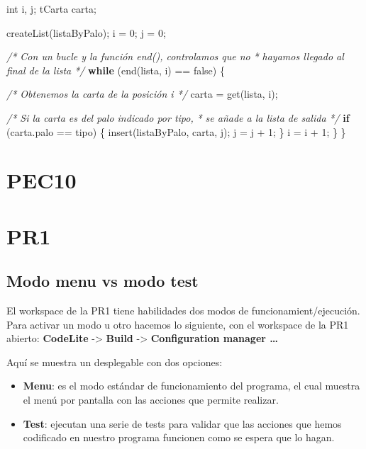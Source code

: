 \documentclass[
]{book}
\newenvironment{Shaded}{\begin{snugshade}}{\end{snugshade}}
\newcommand{\CommentTok}[1]{\textcolor[rgb]{0.56,0.35,0.01}{\textit{#1}}}
\newcommand{\ControlFlowTok}[1]{\textcolor[rgb]{0.13,0.29,0.53}{\textbf{#1}}}
\newcommand{\DataTypeTok}[1]{\textcolor[rgb]{0.13,0.29,0.53}{#1}}
\newcommand{\DecValTok}[1]{\textcolor[rgb]{0.00,0.00,0.81}{#1}}
\newcommand{\NormalTok}[1]{#1}
\providecommand{\tightlist}{%
  \setlength{\itemsep}{0pt}\setlength{\parskip}{0pt}}
\begin{document}
\begin{Shaded}
\begin{Highlighting}[]
    \DataTypeTok{int}\NormalTok{ i, j;}
\NormalTok{    tCarta carta;}

\NormalTok{    createList(listaByPalo);}
\NormalTok{    i = }\DecValTok{0}\NormalTok{;}
\NormalTok{    j = }\DecValTok{0}\NormalTok{;}

    \CommentTok{/* Con un bucle y la función end(), controlamos que no }
\CommentTok{     * hayamos llegado al final de la lista}
\CommentTok{     */}
   \ControlFlowTok{while}\NormalTok{ (end(lista, i) == false) \{}

        \CommentTok{/* Obtenemos la carta de la posición i */}
\NormalTok{        carta = get(lista, i);}

        \CommentTok{/* Si la carta es del palo indicado por tipo, }
\CommentTok{         * se añade a la lista de salida}
\CommentTok{         */}
        \ControlFlowTok{if}\NormalTok{ (carta.palo == tipo) \{}
\NormalTok{            insert(listaByPalo, carta, j);}
\NormalTok{            j = j + }\DecValTok{1}\NormalTok{;}
\NormalTok{        \}}
\NormalTok{        i = i + }\DecValTok{1}\NormalTok{;}
\NormalTok{    \}}
\NormalTok{\}}
\end{Highlighting}
\end{Shaded}

\hypertarget{pec10}{%
\chapter{PEC10}\label{pec10}}

\hypertarget{pr1}{%
\chapter{PR1}\label{pr1}}

\hypertarget{modo-menu-vs-modo-test}{%
\section{Modo menu vs modo test}\label{modo-menu-vs-modo-test}}

El workspace de la PR1 tiene habilidades dos modos de funcionamient/ejecución. Para activar un modo u otro hacemos lo siguiente, con el workspace de la PR1 abierto: \textbf{CodeLite} -\textgreater{} \textbf{Build} -\textgreater{} \textbf{Configuration manager \ldots{}}

Aquí se muestra un desplegable con dos opciones:

\begin{itemize}
\tightlist
\item
  \textbf{Menu}: es el modo estándar de funcionamiento del programa, el cual muestra el menú por pantalla con las acciones que permite realizar.
\item
  \textbf{Test}: ejecutan una serie de tests para validar que las acciones que hemos codificado en nuestro programa funcionen como se espera que lo hagan.
\end{itemize}
\end{document}

